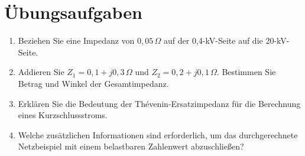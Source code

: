 \section{Übungsaufgaben}

\begin{enumerate}
  \item Beziehen Sie eine Impedanz von \(0{,}05\,\Omega\) auf der
        0{,}4-kV-Seite auf die 20-kV-Seite.
  \item Addieren Sie \(Z_1=0{,}1+j0{,}3\,\Omega\) und
        \(Z_2=0{,}2+j0{,}1\,\Omega\). Bestimmen Sie Betrag und Winkel
        der Gesamtimpedanz.
  \item Erklären Sie die Bedeutung der Thévenin-Ersatzimpedanz für die
        Berechnung eines Kurzschlussstroms.
  \item Welche zusätzlichen Informationen sind erforderlich, um das
        durchgerechnete Netzbeispiel mit einem belastbaren Zahlenwert
        abzuschließen?
\end{enumerate}